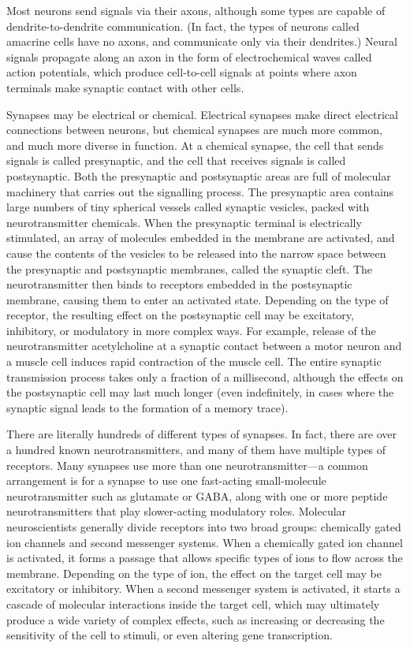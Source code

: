 Most neurons send signals via their axons, although some types are capable of dendrite-to-dendrite communication. (In fact, the types of neurons called amacrine cells have no axons, and communicate only via their dendrites.) Neural signals propagate along an axon in the form of electrochemical waves called action potentials, which produce cell-to-cell signals at points where axon terminals make synaptic contact with other cells.

Synapses may be electrical or chemical. Electrical synapses make direct electrical connections between neurons, but chemical synapses are much more common, and much more diverse in function. At a chemical synapse, the cell that sends signals is called presynaptic, and the cell that receives signals is called postsynaptic. Both the presynaptic and postsynaptic areas are full of molecular machinery that carries out the signalling process. The presynaptic area contains large numbers of tiny spherical vessels called synaptic vesicles, packed with neurotransmitter chemicals. When the presynaptic terminal is electrically stimulated, an array of molecules embedded in the membrane are activated, and cause the contents of the vesicles to be released into the narrow space between the presynaptic and postsynaptic membranes, called the synaptic cleft. The neurotransmitter then binds to receptors embedded in the postsynaptic membrane, causing them to enter an activated state. Depending on the type of receptor, the resulting effect on the postsynaptic cell may be excitatory, inhibitory, or modulatory in more complex ways. For example, release of the neurotransmitter acetylcholine at a synaptic contact between a motor neuron and a muscle cell induces rapid contraction of the muscle cell. The entire synaptic transmission process takes only a fraction of a millisecond, although the effects on the postsynaptic cell may last much longer (even indefinitely, in cases where the synaptic signal leads to the formation of a memory trace).

There are literally hundreds of different types of synapses. In fact, there are over a hundred known neurotransmitters, and many of them have multiple types of receptors. Many synapses use more than one neurotransmitter---a common arrangement is for a synapse to use one fast-acting small-molecule neurotransmitter such as glutamate or GABA, along with one or more peptide neurotransmitters that play slower-acting modulatory roles. Molecular neuroscientists generally divide receptors into two broad groups: chemically gated ion channels and second messenger systems. When a chemically gated ion channel is activated, it forms a passage that allows specific types of ions to flow across the membrane. Depending on the type of ion, the effect on the target cell may be excitatory or inhibitory. When a second messenger system is activated, it starts a cascade of molecular interactions inside the target cell, which may ultimately produce a wide variety of complex effects, such as increasing or decreasing the sensitivity of the cell to stimuli, or even altering gene transcription.

